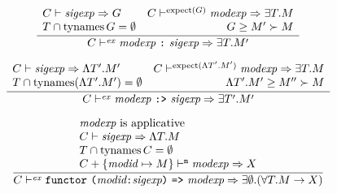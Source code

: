 \begin{equation}		%
\label{conmodexp}
\frac{\begin{array}{lr}
      \C\ts\sigexp\ra\G &
      \C\ts^{\expectofsig{\G}}\modexp\ra\exmod{\T}{\M}  \\
      \T \cap \TyNamesFcn\G = \emptyset &
      \siginstantiates{\G}{\M'}\succ \M 
       \end{array}
     }
     {\C\ts^\expect\conmodexp\ra\exmod{\T}{\M'}}
\end{equation}

\begin{equation}		%
\label{absmodexp}
\frac{\begin{array}{lr}
      \C\ts\sigexp\ra\sig{\T'}{\M'} &
      \C\ts^{\expectofsig{\sig{\T'}{\M'}}}\modexp\ra\exmod{\T}{\M} \\
      \T \cap \TyNamesFcn(\sig{\T'}{\M'}) = \emptyset &
      \siginstantiates{\sig{\T'}{\M'}}{\M''}\succ \M 
       \end{array}
     }
     {\C\ts^\expect\absmodexp\ra\exmod{\T'}{\M'}}
\end{equation}



\begin{equation}		%
\label{genfunctormodexp-rule}
\frac{\begin{array}{l}
      \mbox{\modexp\ is applicative}\\
      \C\ts\sigexp\ra\sig{\T}{\M} \\
      \T \cap \TyNamesFcn \C = \emptyset \\ 
      \C+\{\modid\mapsto\M\}\ts^\expectmod\modexp\ra\XM \\
      \end{array}
     }
     {\C\ts^\expect\genfunctormodexp\ra\exmod{\emptyset}{(\fun{\T}{\M}{\XM})}}
\end{equation}


